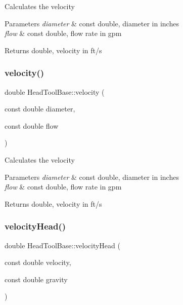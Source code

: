 Calculates the velocity


\begin{DoxyParams}{Parameters}
{\em diameter} & const double, diameter in inches \\
\hline
{\em flow} & const double, flow rate in gpm\\
\hline
\end{DoxyParams}
\begin{DoxyReturn}{Returns}
double, velocity in ft/s 
\end{DoxyReturn}
\mbox{\label{class_head_tool_base_ab79bb695c514b740d9ea01df60b68a23}} 
\subsubsection{\texorpdfstring{velocity()}{velocity()}\hspace{0.1cm}{\footnotesize\ttfamily [3/3]}}
{\footnotesize\ttfamily double Head\+Tool\+Base\+::velocity (\begin{DoxyParamCaption}\item[{const double}]{diameter,  }\item[{const double}]{flow }\end{DoxyParamCaption})\hspace{0.3cm}{\ttfamily [protected]}}

Calculates the velocity


\begin{DoxyParams}{Parameters}
{\em diameter} & const double, diameter in inches \\
\hline
{\em flow} & const double, flow rate in gpm\\
\hline
\end{DoxyParams}
\begin{DoxyReturn}{Returns}
double, velocity in ft/s 
\end{DoxyReturn}
\mbox{\label{class_head_tool_base_a1dbece05fc1a248fa2aa64b6f09602f6}} 
\subsubsection{\texorpdfstring{velocity\+Head()}{velocityHead()}\hspace{0.1cm}{\footnotesize\ttfamily [1/3]}}
{\footnotesize\ttfamily double Head\+Tool\+Base\+::velocity\+Head (\begin{DoxyParamCaption}\item[{const double}]{velocity,  }\item[{const double}]{gravity }\end{DoxyParamCaption})\hspace{0.3cm}{\ttfamily [protected]}}

